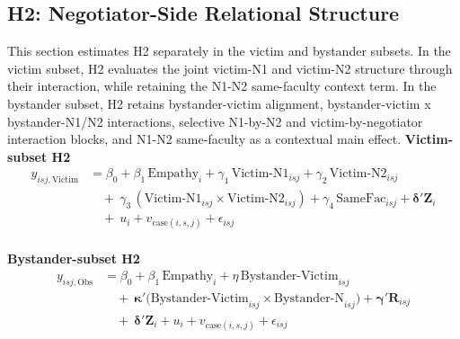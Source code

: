 \documentclass[11pt]{article}
\begin{document}
\subsection{H2: Negotiator-Side Relational Structure}
This section estimates H2 separately in the victim and bystander subsets. In the victim subset, H2 evaluates the joint victim-N1 and victim-N2 structure through their interaction, while retaining the N1-N2 same-faculty context term. In the bystander subset, H2 retains bystander-victim alignment, bystander-victim x bystander-N1/N2 interactions, selective N1-by-N2 and victim-by-negotiator interaction blocks, and N1-N2 same-faculty as a contextual main effect.
\textbf{Victim-subset H2}
\[
\begin{aligned}
y_{isj,\mathrm{Victim}} &= \beta_0 + \beta_1\,\mathrm{Empathy}_i + \gamma_1\,\mathrm{Victim\text{-}N1}_{isj} + \gamma_2\,\mathrm{Victim\text{-}N2}_{isj} \\
&\quad +\ \gamma_3\,(\mathrm{Victim\text{-}N1}_{isj}\times\mathrm{Victim\text{-}N2}_{isj}) + \gamma_4\,\mathrm{SameFac}_{isj} + \boldsymbol{\delta}'\mathbf{Z}_i \\
&\quad +\ u_i + v_{\mathrm{case}(i,s,j)} + \epsilon_{isj} \\
\end{aligned}
\]

\textbf{Bystander-subset H2}
\[
\begin{aligned}
y_{isj,\mathrm{Obs}} &= \beta_0 + \beta_1\,\mathrm{Empathy}_i + \eta\,\mathrm{Bystander\text{-}Victim}_{isj} \\
&\quad +\ \boldsymbol{\kappa}'\bigl(\mathrm{Bystander\text{-}Victim}_{isj}\times\mathrm{Bystander\text{-}N}_{isj}\bigr) + \boldsymbol{\gamma}'\mathbf{R}_{isj} \\
&\quad +\ \boldsymbol{\delta}'\mathbf{Z}_i + u_i + v_{\mathrm{case}(i,s,j)} + \epsilon_{isj} \\
\end{aligned}
\]
\end{document}
